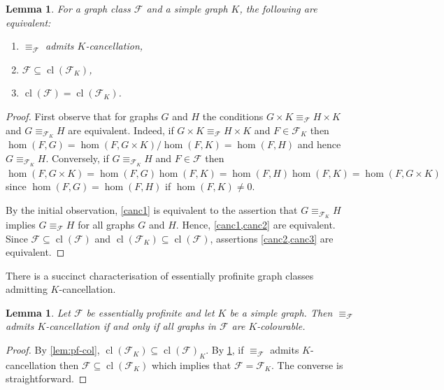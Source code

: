 \documentclass[3p,final]{elsarticle}
\DeclareMathOperator{\cl}{cl}
\newtheorem{lemma}[theorem]{Lemma}
\begin{document}
	\begin{lemma} \label{lem:cancellation}
		For a graph class $\mathcal{F}$ and a simple graph $K$, the following are equivalent:
		\begin{enumerate}
			\item $\equiv_{\mathcal{F}}$ admits $K$-cancellation,\label{canc1}
			\item $\mathcal{F} \subseteq \cl(\mathcal{F}_K)$,\label{canc2}
			\item $\cl(\mathcal{F}) = \cl(\mathcal{F}_K)$.\label{canc3}
		\end{enumerate}
	\end{lemma}
	\begin{proof}
		First observe that for graphs $G$ and $H$ the conditions $G \times K \equiv_{\mathcal{F}} H \times K$ and $G \equiv_{\mathcal{F}_K} H$ are equivalent.
		Indeed, if $G \times K \equiv_{\mathcal{F}} H \times K$ and $F \in \mathcal{F}_K$ then $\hom(F, G) = \hom(F, G \times K)/\hom(F, K) = \hom(F, H)$ and hence $G \equiv_{\mathcal{F}_K} H$.
		Conversely, if $G \equiv_{\mathcal{F}_K} H$ and $F \in \mathcal{F}$ then $\hom(F, G \times K) = \hom(F, G)\hom(F, K) = \hom(F, H) \hom(F, K) = \hom(F, G \times K)$ since $\hom(F, G) = \hom(F, H)$ if $\hom(F, K) \neq 0$.
		
		By the initial observation, \cref{canc1} is equivalent to the assertion that $G \equiv_{\mathcal{F}_K} H$ implies $G \equiv_{\mathcal{F}} H $ for all graphs $G$ and $H$. Hence, \cref{canc1,canc2} are equivalent.
		Since $\mathcal{F} \subseteq \cl(\mathcal{F})$ and $\cl(\mathcal{F}_K) \subseteq \cl(\mathcal{F})$, assertions \cref{canc2,canc3} are equivalent.
	\end{proof}
	
	There is a succinct characterisation of essentially profinite graph classes admitting $K$-cancellation.
	
	\begin{lemma} \label{cor:cancellation-pf}
		Let $\mathcal{F}$ be essentially profinite and let $K$ be a simple graph.
		Then $\equiv_{\mathcal{F}}$ admits $K$-cancellation if and only if all graphs in $\mathcal{F}$ are $K$-colourable.
	\end{lemma}
	\begin{proof}
		By \cref{lem:pf-col}, $\cl(\mathcal{F}_K) \subseteq \cl(\mathcal{F})_K$.
		By \cref{lem:cancellation}, if $\equiv_{\mathcal{F}}$ admits $K$-cancellation then $\mathcal{F} \subseteq \cl(\mathcal{F}_K)$ which implies that $\mathcal{F} = \mathcal{F}_K$.
		The converse is straightforward.
	\end{proof}
	
\end{document}

